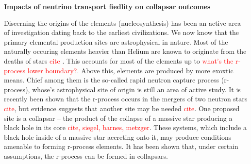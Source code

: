 \documentclass[12pt]{article}
\begin{document}
\setcounter{page}{1}  \renewcommand{\thepage}
           {\arabic{page} }%

\begin{center}
{\bf Impacts of neutrino transport fiedlity on collapsar outcomes} \vspace{-0.15in}
\end{center}




Discerning the origins of the elements (nucleosynthesis) has been an active area of investigation dating back to the earliest civilizations.
We now know that the primary elemental production sites are astrophysical in nature.
Most of the naturally occuring elements heavier than Helium are known to originate from the deaths of stars \textcolor{red}{cite} \citep{mezzacappa:2001}.
This accounts for most of the elements up to \textcolor{red}{what's the r-process lower boundary?}.
Above this, elements are produced by more exoxtic means.
Chief among them is the so-called rapid neutron capture process (r-process), whose's astrophysical site of origin is still an area of active study.
It is recently been shown that the r-process occurs in the mergers of two neutron stars \textcolor{red}{cite}, but evidence suggests that another site may be needed \textcolor{red}{cite}.
One proposed site is a collapsar -- the product of the collapse of a massive star producing a black hole in its core \textcolor{red}{cite, siegel, barnes, metzger}.
These systems, which include a black hole inside of a massive star accreting onto it, may produce conditions amenable to forming r-process elements.
It has been shown that, under certain assumptions, the r-process can be formed in collapsars.
\end{document}
